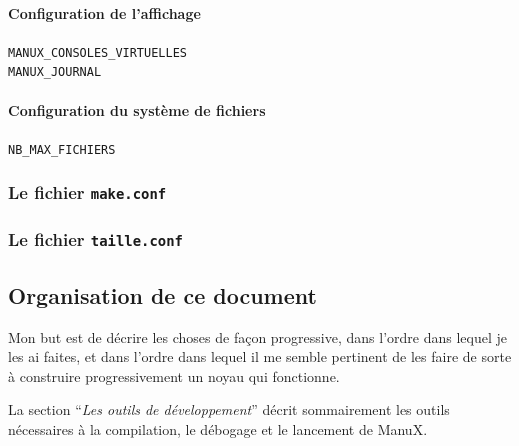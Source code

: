 %
%
%
\paragraph{Configuration de l'affichage}

\begin{description}
   \item[{\tt MANUX\_CONSOLES\_VIRTUELLES}]
   \item[{\tt MANUX\_JOURNAL}]
\end{description}

%
%
%
\paragraph{Configuration du système de fichiers}

\begin{description}
   \item[{\tt NB\_MAX\_FICHIERS}]
\end{description}

%
\subsubsection{Le fichier {\tt make.conf}}

%
\subsubsection{Le fichier {\tt taille.conf}}


%   
\subsection{Organisation de ce document}

   Mon but est de décrire les choses de façon progressive, dans
l'ordre dans lequel je les ai faites, et dans l'ordre dans lequel il
me semble pertinent de les faire de sorte à construire progressivement
un noyau qui fonctionne.

   La section ``{\em Les outils de développement}'' décrit sommairement
les outils nécessaires à la compilation, le débogage et le lancement
de ManuX.

